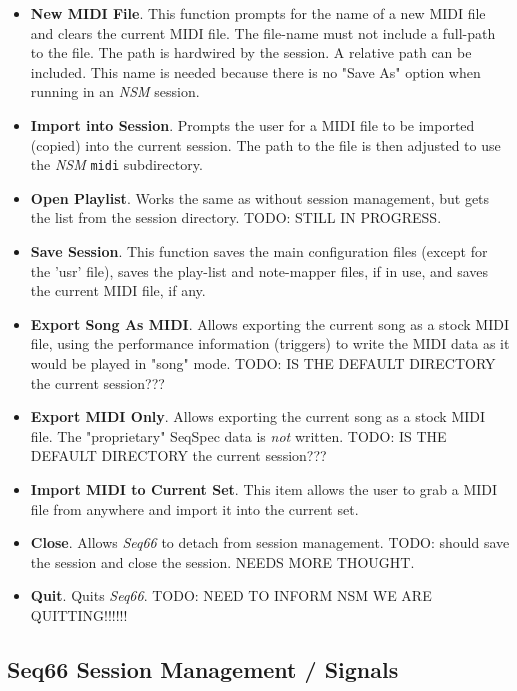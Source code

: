    \begin{itemize}
      \item \textbf{New MIDI File}.
         This function prompts for the name of a
         new MIDI file and clears the current MIDI file.  The file-name must not
         include a full-path to the file.  The path is hardwired by the
         session.  A relative path can be included.  This name is needed
         because there is no "Save As" option when running in an \textsl{NSM}
         session.
      \item \textbf{Import into Session}.
         Prompts the user for a MIDI file to
         be imported (copied) into the current session.  The path to the file
         is then adjusted to use the \textsl{NSM} \texttt{midi} subdirectory.
      \item \textbf{Open Playlist}.
         Works the same as without session
         management, but gets the list from the session directory.
         TODO: STILL IN PROGRESS.
      \item \textbf{Save Session}.
         This function saves the main configuration
         files (except for the 'usr' file), saves the play-list and note-mapper
         files, if in use, and saves the current MIDI file, if any.
      \item \textbf{Export Song As MIDI}.
         Allows exporting the current song as a stock MIDI file, using the
         performance information (triggers) to write the MIDI data as it would
         be played in "song" mode.
         TODO: IS THE DEFAULT DIRECTORY the current session???
      \item \textbf{Export MIDI Only}.
         Allows exporting the current song as a stock MIDI file.
         The "proprietary" SeqSpec data is \textsl{not} written.
         TODO: IS THE DEFAULT DIRECTORY the current session???
      \item \textbf{Import MIDI to Current Set}.
         This item allows the user to grab a MIDI file from anywhere and import
         it into the current set.
      \item \textbf{Close}.
         Allows \textsl{Seq66} to detach from session management.
         TODO:  should save the session and close the session.
         NEEDS MORE THOUGHT.
      \item \textbf{Quit}.
         Quits \textsl{Seq66}.
         TODO: NEED TO INFORM NSM WE ARE QUITTING!!!!!!
   \end{itemize}

\subsection{Seq66 Session Management / Signals}
\label{subsec:sessions_signals}

